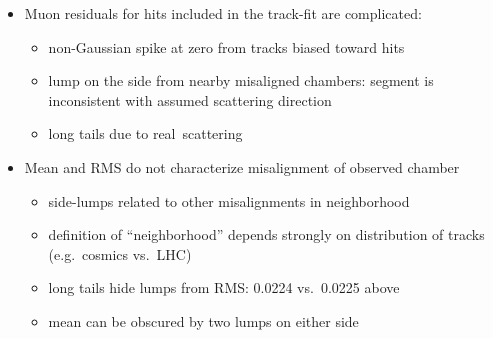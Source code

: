 \documentclass[compress]{beamer}
\begin{document}
\begin{frame}
\begin{columns}
\begin{itemize}
\item Muon residuals for hits included in the track-fit are complicated:
\begin{itemize}
\item \scriptsize non-Gaussian spike at zero from tracks biased toward hits
\item \scriptsize lump on the side from nearby misaligned chambers: segment is
  inconsistent with assumed scattering direction
\item \scriptsize long tails due to \mbox{real scattering\hspace{-1 cm}}
\end{itemize}
\item Mean and RMS do not characterize misalignment of observed
  chamber
\begin{itemize}
\item \scriptsize side-lumps related to other misalignments in neighborhood
\item \scriptsize definition of ``neighborhood'' depends strongly on distribution of tracks \\ (e.g.\ cosmics vs.\ LHC)
\item \scriptsize long tails hide lumps from RMS: 0.0224 vs.\ 0.0225 above
\item \scriptsize mean can be obscured by two lumps on either side
\end{itemize}
\end{itemize}

\end{columns}
\end{frame}
\end{document}
